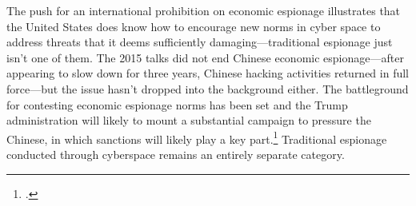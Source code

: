 \documentclass{memoir}
\begin{document}
\begin{refsegment}
The push for an international prohibition on economic espionage illustrates that the United States does know how to encourage new norms in cyber space to address threats that it deems sufficiently damaging---traditional espionage just isn't one of them. The 2015 talks did not end Chinese economic espionage---after appearing to slow down for three years, Chinese hacking activities returned in full force---but the issue hasn't dropped into the background either. The battleground for contesting economic espionage norms has been set and the Trump administration will likely to mount a substantial campaign to pressure the Chinese, in which sanctions will likely play a key part.\footcite{laskai_new_2018} Traditional espionage conducted through cyberspace remains an entirely separate category.









\end{refsegment}
\end{document}
